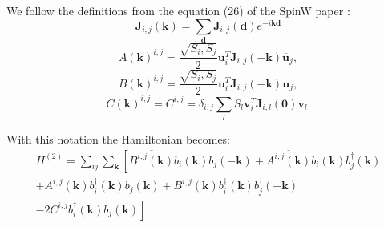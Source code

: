 \documentclass[a4paper,12pt]{article}
\begin{document}
        We follow the definitions from the equation (26) of the SpinW paper \cite{toth2015linear}:
        \begin{equation}
            \boldsymbol{J}_{i,j}(\boldsymbol{k}) = \sum_{\boldsymbol{d}}\boldsymbol{J}_{i,j}(\boldsymbol{d})e^{-i\boldsymbol{k}\boldsymbol{d}}
        \end{equation}
        \begin{equation}
            A(\boldsymbol{k})^{i,j} = \dfrac{\sqrt{S_i, S_j}}{2}\boldsymbol{u}^T_i\boldsymbol{J}_{i,j}(-\boldsymbol{k})\overline{\boldsymbol{u}}_j,
        \end{equation}
        \begin{equation}
            B(\boldsymbol{k})^{i,j} = \dfrac{\sqrt{S_i, S_j}}{2}\boldsymbol{u}^T_i\boldsymbol{J}_{i,j}(-\boldsymbol{k})\boldsymbol{u}_j,
        \end{equation}
        \begin{equation}
            C(\boldsymbol{k})^{i,j} = C^{i,j} = \delta_{i,j}\sum_{l}S_l \boldsymbol{v}^T_i\boldsymbol{J}_{i, l}(\boldsymbol{0})\boldsymbol{v}_l.
        \end{equation}

        With this notation the Hamiltonian becomes:
        \begin{multline}
            H^{(2)} = \sum_{ij}\sum_{\boldsymbol{k}}\left[\overline{B^{i,j}(\boldsymbol{k})}b_{i}(\boldsymbol{k})b_{j}(-\boldsymbol{k}) +
            \overline{A^{i,j}(\boldsymbol{k})}b_{i}(\boldsymbol{k})b^{\dag}_{j}(\boldsymbol{k})\right. \\+ 
            A^{i,j}(\boldsymbol{k})b^{\dag}_{i}(\boldsymbol{k})b_{j}(\boldsymbol{k}) +
            B^{i,j}(\boldsymbol{k})b^{\dag}_{i}(\boldsymbol{k})b^{\dag}_{j}(-\boldsymbol{k}) \\-
            \left.2 C^{i,j}b^{\dag}_{i}(\boldsymbol{k})b_{j}(\boldsymbol{k})\right] \label{eq:ham-before}
        \end{multline}
\end{document}
